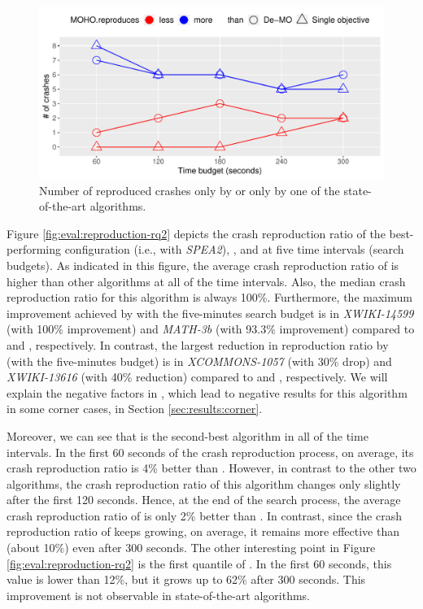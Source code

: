 \begin{figure}[t]
    \centering
    \includegraphics[width=\linewidth]{papers/moho/figures/rq2-reproduced-crashes.pdf}
    \caption{Number of reproduced crashes only by \moho or only by one of the state-of-the-art algorithms.}
    \label{fig:eval:results-rq2}
\end{figure}

Figure \ref{fig:eval:reproduction-rq2} depicts the crash reproduction ratio of the best-performing \moho configuration (i.e., with \textit{SPEA2}), \SGGA, and \decomposition at five time intervals (search budgets). As indicated in this figure, the average crash reproduction ratio of \moho is higher than other algorithms at all of the time intervals. Also, the median crash reproduction ratio for this algorithm is always 100\%. Furthermore, the maximum improvement achieved by \moho with the five-minutes search budget is in \textit{XWIKI-14599} (with 100\% improvement) and \textit{MATH-3b} (with 93.3\% improvement) compared to \SGGA and \decomposition, respectively. In contrast, the largest reduction in reproduction ratio by \moho (with the five-minutes budget) is in \textit{XCOMMONS-1057} (with 30\% drop) and \textit{XWIKI-13616} (with 40\% reduction) compared to \SGGA and \decomposition, respectively. We will explain the negative factors in \moho, which lead to negative results for this algorithm in some corner cases, in Section \ref{sec:results:corner}.
 
Moreover, we can see that \decomposition is the second-best algorithm in all of the time intervals. In the first 60 seconds of the crash reproduction process, on average, its crash reproduction ratio is 4\% better than \SGGA. However, in contrast to the other two algorithms, the crash reproduction ratio of this algorithm changes only slightly after the first 120 seconds. Hence, at the end of the search process, the average crash reproduction ratio of \decomposition is only 2\% better than \SGGA. In contrast, since the crash reproduction ratio of \moho keeps growing, on average, it remains more effective than \SGGA (about 10\%) even after 300 seconds. The other interesting point in Figure \ref{fig:eval:reproduction-rq2} is the first quantile of \moho. In the first 60 seconds, this value is lower than 12\%, but it grows up to 62\% after 300 seconds. This improvement is not observable in state-of-the-art algorithms.

